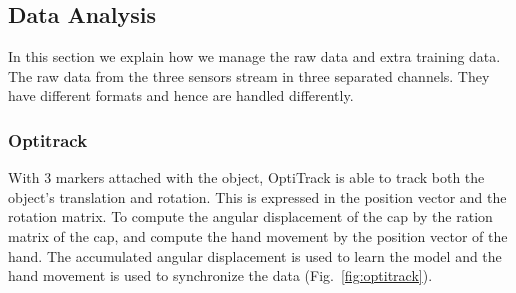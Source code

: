 
%

\subsection{Data Analysis}
\label{dataanalysis}
In this section we explain how we manage the raw data and extra training data.
The raw data from the three sensors stream in three separated channels. They have different formats and hence are handled differently.

\subsubsection{Optitrack}
\label{sec:optiktrack}
With 3 markers attached with the object, OptiTrack is able to track both the object's translation and rotation. This is expressed in the position vector and the rotation matrix. To compute the angular displacement of the cap by the ration matrix of the cap, and compute the hand movement by the position vector of the hand. The accumulated angular displacement is used to learn the model and the hand movement is used to synchronize the data (Fig.~\ref{fig:optitrack}).

